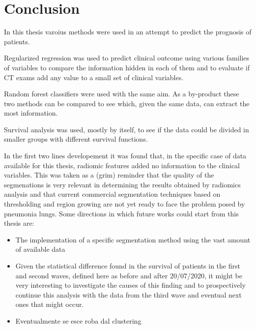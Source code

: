 \chapter{Conclusion}

In this thesis varoius methods were used in an attempt to predict the prognosis of \covid patients. 

Regularized regression was used to predict clinical outcome using various families of variables to compare the information hidden in each of them and to evaluate if CT exams add any value to a small set of clinical variables.

Random forest classifiers were used with the same aim. As a by-product these two methods can be compared to see which, given the same data, can extract the most information.

Survival analysis was used, mostly by itself, to see if the data could be divided in smaller groups with different survival functions.

In the first two lines developement it was found that, in the specific case of data available for this thesis, radiomic features added no information to the clinical variables.
This was taken as a (grim) reminder that the quality of the segmenations is very relevant in determining the results obtained by radiomics analysis and that current commercial segmentation techniques based on thresholding and region growing are not yet ready to face the problem posed by \covid pneumonia lungs.
Some directions in which future works could start from this thesis are:

\begin{itemize}
\item The implementation of a \covid specific segmentation method using the vast amount of available data
\item Given the statistical difference found in the survival of patients in the first and second waves, defined here as before and after 20/07/2020, it might be very interesting to investigate the causes of this finding and to prospectively continue this analysis with the data from the third wave and eventual next ones that might occur.
\item Eventualmente se esce roba dal clustering
\end{itemize}